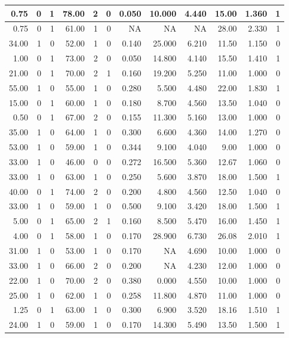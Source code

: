 \documentclass[
]{article}
\begin{document}
\begin{table}
\begin{tabular}[t]{r|r|r|r|r|r|r|r|r|r|r|r}
\hline
0.75 & 0 & 1 & 78.00 & 2 & 0 & 0.050 & 10.000 & 4.440 & 15.00 & 1.360 & 1\\
\hline
0.75 & 0 & 1 & 61.00 & 1 & 0 & NA & NA & NA & 28.00 & 2.330 & 1\\
\hline
34.00 & 1 & 0 & 52.00 & 1 & 0 & 0.140 & 25.000 & 6.210 & 11.50 & 1.150 & 0\\
\hline
1.00 & 0 & 1 & 73.00 & 2 & 0 & 0.050 & 14.800 & 4.140 & 15.50 & 1.410 & 1\\
\hline
21.00 & 0 & 1 & 70.00 & 2 & 1 & 0.160 & 19.200 & 5.250 & 11.00 & 1.000 & 0\\
\hline
55.00 & 1 & 0 & 55.00 & 1 & 0 & 0.280 & 5.500 & 4.480 & 22.00 & 1.830 & 1\\
\hline
15.00 & 0 & 1 & 60.00 & 1 & 0 & 0.180 & 8.700 & 4.560 & 13.50 & 1.040 & 0\\
\hline
0.50 & 0 & 1 & 67.00 & 2 & 0 & 0.155 & 11.300 & 5.160 & 13.00 & 1.000 & 0\\
\hline
35.00 & 1 & 0 & 64.00 & 1 & 0 & 0.300 & 6.600 & 4.360 & 14.00 & 1.270 & 0\\
\hline
53.00 & 1 & 0 & 59.00 & 1 & 0 & 0.344 & 9.100 & 4.040 & 9.00 & 1.000 & 0\\
\hline
33.00 & 1 & 0 & 46.00 & 0 & 0 & 0.272 & 16.500 & 5.360 & 12.67 & 1.060 & 0\\
\hline
33.00 & 1 & 0 & 63.00 & 1 & 0 & 0.250 & 5.600 & 3.870 & 18.00 & 1.500 & 1\\
\hline
40.00 & 0 & 1 & 74.00 & 2 & 0 & 0.200 & 4.800 & 4.560 & 12.50 & 1.040 & 0\\
\hline
33.00 & 1 & 0 & 59.00 & 1 & 0 & 0.500 & 9.100 & 3.420 & 18.00 & 1.500 & 1\\
\hline
5.00 & 0 & 1 & 65.00 & 2 & 1 & 0.160 & 8.500 & 5.470 & 16.00 & 1.450 & 1\\
\hline
4.00 & 0 & 1 & 58.00 & 1 & 0 & 0.170 & 28.900 & 6.730 & 26.08 & 2.010 & 1\\
\hline
31.00 & 1 & 0 & 53.00 & 1 & 0 & 0.170 & NA & 4.690 & 10.00 & 1.000 & 0\\
\hline
33.00 & 1 & 0 & 66.00 & 2 & 0 & 0.200 & NA & 4.230 & 12.00 & 1.000 & 0\\
\hline
22.00 & 1 & 0 & 70.00 & 2 & 0 & 0.380 & 0.000 & 4.550 & 10.00 & 1.000 & 0\\
\hline
25.00 & 1 & 0 & 62.00 & 1 & 0 & 0.258 & 11.800 & 4.870 & 11.00 & 1.000 & 0\\
\hline
1.25 & 0 & 1 & 63.00 & 1 & 0 & 0.300 & 6.900 & 3.520 & 18.16 & 1.510 & 1\\
\hline
24.00 & 1 & 0 & 59.00 & 1 & 0 & 0.170 & 14.300 & 5.490 & 13.50 & 1.500 & 1\\

\end{tabular}
\end{table}
\end{document}
